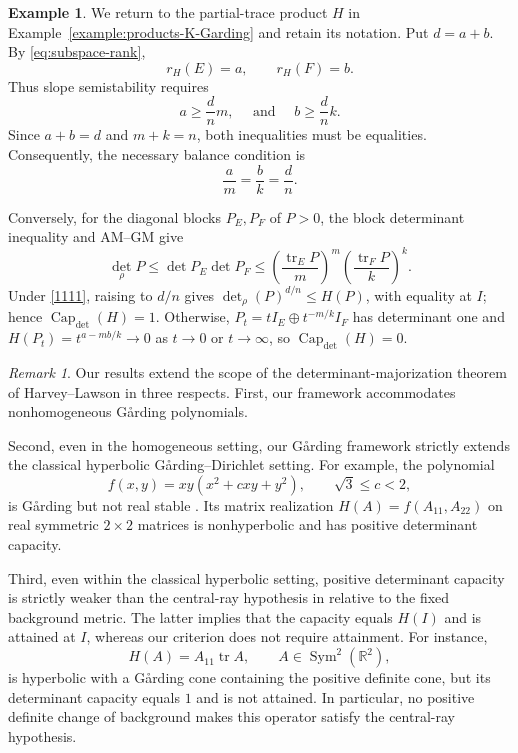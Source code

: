 \documentclass[oneside,english,letterpaper]{amsart}
\numberwithin{equation}{section}
\theoremstyle{plain}
\theoremstyle{definition}
\newtheorem{example}[thm]{Example}
\theoremstyle{remark}
\newtheorem{rem}[thm]{Remark}
\def\Capacity{\operatorname{Cap}}
\begin{document}
\begin{example}
\label{example:partial-trace-capacity}
We return to the partial-trace product $H$ in
Example~\ref{example:products-K-Garding} and retain its
notation. Put $d=a+b$. By \eqref{eq:subspace-rank},
$$
r_H(E)=a,\qquad r_H(F)=b.
$$
Thus slope semistability requires
\[
a\geq\frac dn m,\quad  \text{ and } \quad  b\geq\frac dn k.
\]
Since $a+b=d$ and $m+k=n$, both inequalities must be equalities.
Consequently, the necessary balance condition is
\begin{equation}
    \label{1111}\frac am=\frac bk=\frac dn.
\end{equation}


Conversely, for the diagonal blocks $P_E,P_F$ of $P>0$,
the block determinant inequality and AM--GM give
\[
\det_\rho P\leq\det P_E\det P_F
\leq\left(\frac{\operatorname{tr}_E P}{m}\right)^m
\left(\frac{\operatorname{tr}_F P}{k}\right)^k.
\]
Under \eqref{1111}, raising to $d/n$ gives
$\det_\rho(P)^{d/n}\leq H(P)$, with equality at $I$;
hence $\Capacity_{\det}(H)=1$.
Otherwise, $P_t=tI_E\oplus t^{-m/k}I_F$ has determinant one and
$H(P_t)=t^{a-mb/k}\to0$ as $t\to0$ or $t\to\infty$,
so $\Capacity_{\det}(H)=0$.
\end{example}

\begin{rem}\label{rem:comparison-HL}
Our results extend the scope of the determinant-majorization theorem
of Harvey--Lawson \cite{HarveyLawsonMajorization} in three respects.
First, our framework accommodates nonhomogeneous G{\aa}rding
polynomials.

Second, even in the homogeneous setting, our G{\aa}rding framework
strictly extends the classical hyperbolic G{\aa}rding--Dirichlet
setting. For example, the polynomial
\[
f(x,y)=xy(x^2+cxy+y^2),\qquad \sqrt{3}\le c<2,
\]
is G{\aa}rding but not real stable
\cite[Example~11.4]{Fang-MaGard}.
Its matrix realization $H(A)=f(A_{11},A_{22})$ on real symmetric
$2\times2$ matrices is nonhyperbolic and has positive determinant
capacity.

Third, even within the classical hyperbolic setting, positive
determinant capacity is strictly weaker than the central-ray
hypothesis in \cite{HarveyLawsonMajorization} relative to the fixed background metric.
The latter implies that the capacity equals $H(I)$ and is attained
at $I$, whereas our criterion does not require attainment.
For instance,
\[
H(A)=A_{11}\operatorname{tr}A,\qquad A\in\operatorname{Sym}^2(\mathbb R^2),
\]
is hyperbolic with a G{\aa}rding cone containing the positive definite
cone, but its determinant capacity equals $1$ and is not attained.
In particular, no positive definite change of background makes
this operator satisfy the central-ray hypothesis.
\end{rem}
\end{document}
